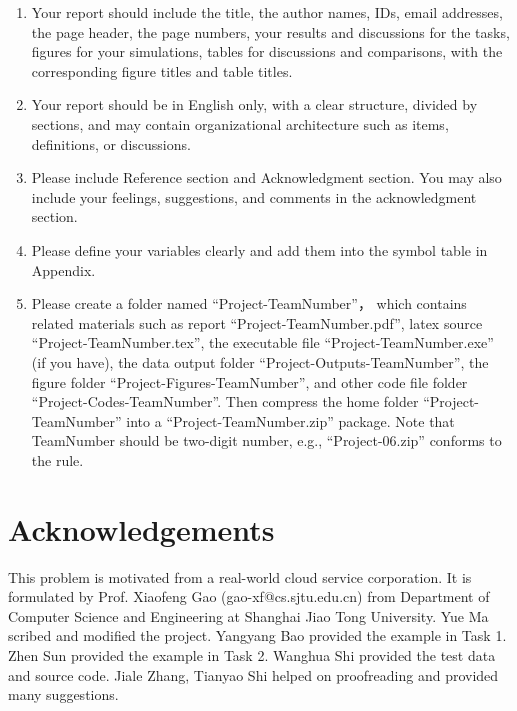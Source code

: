 \documentclass{llncs}
\begin{document}
\begin{enumerate}
  \item Your report should include the title, the author names, IDs, email addresses, the page header, the page numbers, your results and discussions for the tasks, figures for your simulations, tables for discussions and comparisons, with the corresponding figure titles and table titles.

  \item Your report should be in English only, with a clear structure, divided by sections, and may contain organizational architecture such as items, definitions, or discussions.

  \item Please include Reference section and Acknowledgment section. You may also include your feelings, suggestions, and comments in the acknowledgment section.

  \item Please define your variables clearly and add them into the symbol table in Appendix.

  \item Please create a folder named ``Project-TeamNumber''， which contains related materials such as report ``Project-TeamNumber.pdf'', latex source ``Project-TeamNumber.tex'', the executable file ``Project-TeamNumber.exe'' (if you have), the data output folder ``Project-Outputs-TeamNumber'', the figure folder ``Project-Figures-TeamNumber'', and other code file folder  ``Project-Codes-TeamNumber''. Then compress the home folder ``Project-TeamNumber'' into a ``Project-TeamNumber.zip'' package. Note that TeamNumber should be two-digit number, e.g., ``Project-06.zip'' conforms to the rule.
\end{enumerate}





\section*{Acknowledgements}
This problem is motivated from a real-world cloud service corporation. It is formulated by Prof. Xiaofeng Gao (gao-xf@cs.sjtu.edu.cn) from Department of Computer Science and Engineering at Shanghai Jiao Tong University. Yue Ma scribed and modified the project. Yangyang Bao provided the example in Task 1. Zhen Sun provided the example in Task 2. Wanghua Shi provided the test data and source code. Jiale Zhang, Tianyao Shi helped on proofreading and provided many suggestions.
\end{document}
